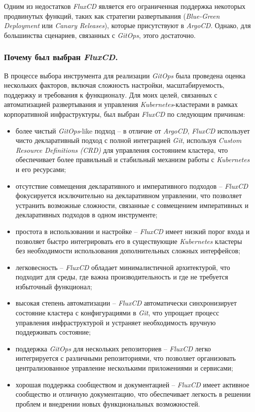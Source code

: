 Одним из недостатков \textit{FluxCD} является его ограниченная поддержка некоторых продвинутых функций, таких как стратегии развертывания (\textit{Blue-Green Deployment} или \textit{Canary Releases}), которые присутствуют в \textit{ArgoCD}. Однако, для большинства сценариев, связанных с \textit{GitOps}, этого достаточно.

\subsubsection{Почему был выбран \textit{FluxCD}.}
В процессе выбора инструмента для реализации \textit{GitOps} была проведена оценка нескольких факторов, включая сложность настройки, масштабируемость, поддержку и требования к функционалу. Для моих целей, связанных с автоматизацией развертывания и управления \textit{Kubernetes}-кластерами в рамках корпоративной инфраструктуры, был выбран \textit{FluxCD} по следующим причинам:

\begin{itemize}
    \item более чистый \textit{GitOps}-like подход -- в отличие от \textit{ArgoCD}, \textit{FluxCD} использует чисто декларативный подход с полной интеграцией \textit{Git}, используя \textit{Custom Resource Definitions (CRD)} для управления состоянием кластера, что обеспечивает более правильный и стабильный механизм работы с \textit{Kubernetes} и его ресурсами; 
    \item отсутствие совмещения декларативного и императивного подходов -- \textit{FluxCD} фокусируется исключительно на декларативном управлении, что позволяет устранить возможные сложности, связанные с совмещением императивных и декларативных подходов в одном инструменте; 
    \item простота в использовании и настройке -- \textit{FluxCD} имеет низкий порог входа и позволяет быстро интегрировать его в существующие \textit{Kubernetes} кластеры без необходимости использования дополнительных сложных интерфейсов; 
    \item легковесность -- \textit{FluxCD} обладает минималистичной архитектурой, что подходит для среды, где важна производительность и где не требуется избыточный функционал; 
    \item высокая степень автоматизации -- \textit{FluxCD} автоматически синхронизирует состояние кластера с конфигурациями в \textit{Git}, что упрощает процесс управления инфраструктурой и устраняет необходимость вручную поддерживать состояние; 
    \item поддержка \textit{GitOps} для нескольких репозиториев -- \textit{FluxCD} легко интегрируется с различными репозиториями, что позволяет организовать централизованное управление несколькими приложениями и сервисами; 
    \item хорошая поддержка сообществом и документацией -- \textit{FluxCD} имеет активное сообщество и отличную документацию, что обеспечивает легкость в решении проблем и внедрении новых функциональных возможностей. 
\end{itemize}

